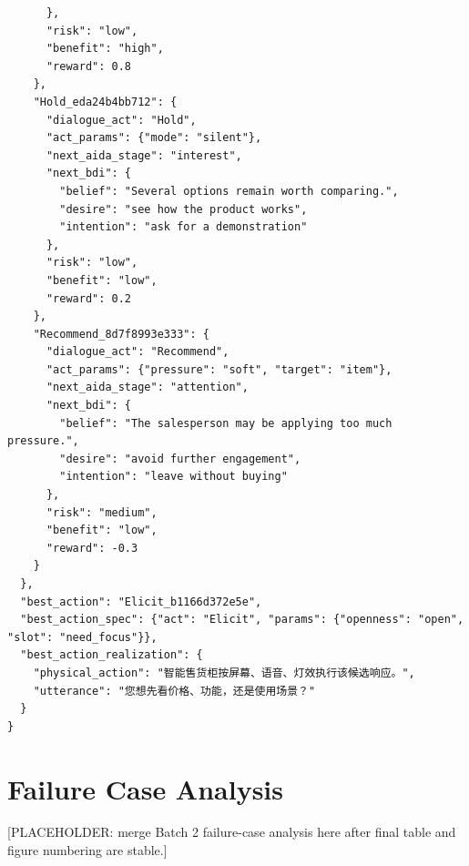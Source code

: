 \begin{verbatim}
      },
      "risk": "low",
      "benefit": "high",
      "reward": 0.8
    },
    "Hold_eda24b4bb712": {
      "dialogue_act": "Hold",
      "act_params": {"mode": "silent"},
      "next_aida_stage": "interest",
      "next_bdi": {
        "belief": "Several options remain worth comparing.",
        "desire": "see how the product works",
        "intention": "ask for a demonstration"
      },
      "risk": "low",
      "benefit": "low",
      "reward": 0.2
    },
    "Recommend_8d7f8993e333": {
      "dialogue_act": "Recommend",
      "act_params": {"pressure": "soft", "target": "item"},
      "next_aida_stage": "attention",
      "next_bdi": {
        "belief": "The salesperson may be applying too much pressure.",
        "desire": "avoid further engagement",
        "intention": "leave without buying"
      },
      "risk": "medium",
      "benefit": "low",
      "reward": -0.3
    }
  },
  "best_action": "Elicit_b1166d372e5e",
  "best_action_spec": {"act": "Elicit", "params": {"openness": "open", "slot": "need_focus"}},
  "best_action_realization": {
    "physical_action": "智能售货柜按屏幕、语音、灯效执行该候选响应。",
    "utterance": "您想先看价格、功能，还是使用场景？"
  }
}
\end{verbatim}

\section{Failure Case Analysis}
\label{app:failures}

[PLACEHOLDER: merge Batch 2 failure-case analysis here after final table and figure numbering are stable.]

